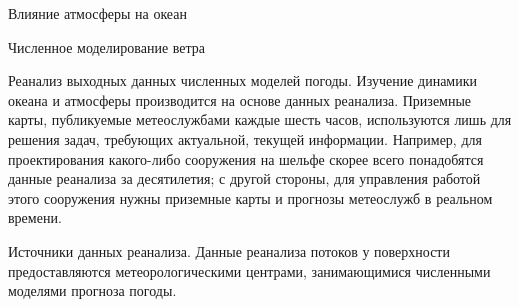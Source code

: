 \begin{chapter}{Влияние атмосферы на океан}
\begin{section}{Численное моделирование ветра}
\begin{paragraph}{Реанализ выходных данных численных моделей погоды.}
Изучение динамики океана и атмосферы производится на основе данных реанализа.
Приземные карты, публикуемые метеослужбами каждые шесть часов, используются 
лишь для решения задач, требующих актуальной, текущей информации. Например, 
для проектирования какого-либо сооружения на шельфе скорее всего понадобятся 
данные реанализа за десятилетия; с другой стороны, для управления работой 
этого сооружения нужны приземные карты и прогнозы метеослужб в реальном времени.
%
\end{paragraph}

\begin{paragraph}{Источники данных реанализа.}
Данные реанализа потоков у поверхности предоставляются
метеорологическими центрами, занимающимися численными моделями
прогноза погоды.
%


\end{paragraph}
\end{section}
\end{chapter}
